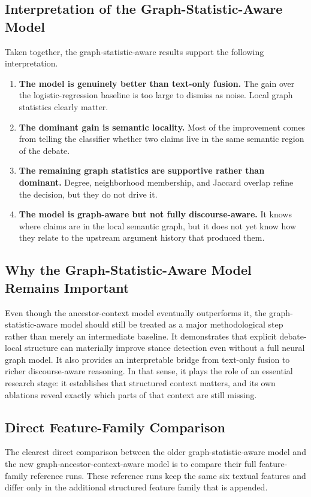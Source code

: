 \documentclass[11pt,a4paper]{article}
\begin{document}
\subsection{Interpretation of the Graph-Statistic-Aware Model}
Taken together, the graph-statistic-aware results support the following interpretation.
\begin{enumerate}[label=\arabic*.]
  \item \textbf{The model is genuinely better than text-only fusion.} The gain over the logistic-regression baseline is too large to dismiss as noise. Local graph statistics clearly matter.
  \item \textbf{The dominant gain is semantic locality.} Most of the improvement comes from telling the classifier whether two claims live in the same semantic region of the debate.
  \item \textbf{The remaining graph statistics are supportive rather than dominant.} Degree, neighborhood membership, and Jaccard overlap refine the decision, but they do not drive it.
  \item \textbf{The model is graph-aware but not fully discourse-aware.} It knows where claims are in the local semantic graph, but it does not yet know how they relate to the upstream argument history that produced them.
\end{enumerate}

\subsection{Why the Graph-Statistic-Aware Model Remains Important}
Even though the ancestor-context model eventually outperforms it, the graph-statistic-aware model should still be
treated as a major methodological step rather than merely an intermediate baseline. It demonstrates that explicit
debate-local structure can materially improve stance detection even without a full neural graph model. It also provides
an interpretable bridge from text-only fusion to richer discourse-aware reasoning. In that sense, it plays the role of
an essential research stage: it establishes that structured context matters, and its own ablations reveal exactly which
parts of that context are still missing.

\subsection{Direct Feature-Family Comparison}
The clearest direct comparison between the older graph-statistic-aware model and the new graph-ancestor-context-aware model is to compare their full feature-family reference runs. These reference runs keep the same six textual features and differ only in the additional structured feature family that is appended.
\end{document}
